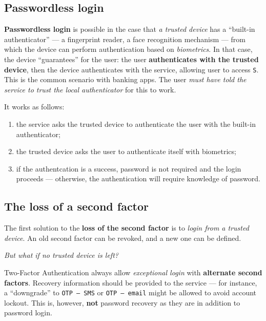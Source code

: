 \documentclass[10pt]{extreport}
\begin{document}
\subsection{Passwordless login}

\textbf{Passwordless login} is possible in the case that \emph{a trusted
device} has a ``built\--in authenticator'' --- a fingerprint reader, a face
recognition mechanism --- from which the device can perform authentication based
on \emph{biometrics}. In that case, the device ``guarantees'' for the user: the
user \textbf{authenticates with the trusted device}, then the device
authenticates with the service, allowing user to access \texttt{S}. This is the
common scenario with banking apps. The user \emph{must have told the service to
trust the local authenticator} for this to work.

It works as follows:
\begin{enumerate}
    \item the service asks the trusted device to authenticate the user with the
        built\--in authenticator;
    \item the trusted device asks the user to authenticate itself with
        biometrics;
    \item if the authentcation is a success, password is not required and the
        login proceeds --- otherwise, the authentication will require knowledge
        of password.
\end{enumerate}

\subsection{The loss of a second factor}

The first solution to the \textbf{loss of the second factor} is to \emph{login
from a trusted device}. An old second factor can be revoked, and a new one can
be defined. 

\vspace*{1cm}\begin{center}\emph{But what if no trusted device is left?}\end{center}\vspace*{1cm}

Two\--Factor Authentication always allow \emph{exceptional login} with
\textbf{alternate second factors}. Recovery information should be provided to
the service --- for instance, a ``downgrade'' to \texttt{OTP --- SMS} or
\texttt{OTP --- email} might be allowed to avoid account lockout. This is,
however, \textbf{not} password recovery as they are in addition to password
login.
\end{document}
